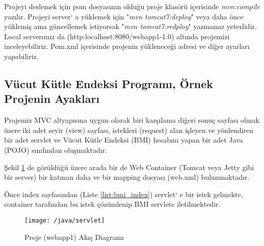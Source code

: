 
Projeyi derlemek için pom dosyasının olduğu proje klasörü içerisinde \emph{mvn:compile} yazılır.
Projeyi server` a yüklemek için "\emph{mvn tomcat7:deploy}" veya daha önce yüklemiş ama güncellemek istiyorsak "\emph{mvn tomcat7:redploy}" yazmamız yeterlidir. Local serverımız da (http:localhost:8080/webapp1-1.0) altında projemizi inceleyebiliriz. Pom.xml içerisinde projenin yükleneceği adresi ve diğer ayarları yapabiliriz.

\subsection{Vücut Kütle Endeksi Programı, Örnek Projenin Ayakları}
Projemiz  MVC altyapısına uygun olarak biri karşılama diğeri sonuç sayfası olmak üzere iki adet seyir (view) sayfası, istekleri (request) alan işleyen ve yönlendiren bir adet servlet ve Vücut Kütle Endeksi (BMI) hesabını yapan bir adet Java (POJO) sınıfından oluşmaktadır. 

Şekil \ref{fig:servletAkis} de görüldüğü üzere arada bir de Web Container (Tomcat veya Jetty gibi bir server) bir katman daha ve bir mapping dosyası (web.xml) bulunmaktadır. 

Önce index sayfasından (Liste \ref{list:bmi_index}) servlet` e bir istek gelmekte, container tarafından bu istek çözümlenip BMI servlete iletilmektedir.
\begin{figure}[h]
\centering\texttt{[image: /java/servlet]}
\caption{Proje (webapp1) Akış Diagramı}
\label{fig:servletAkis}
\end{figure}


